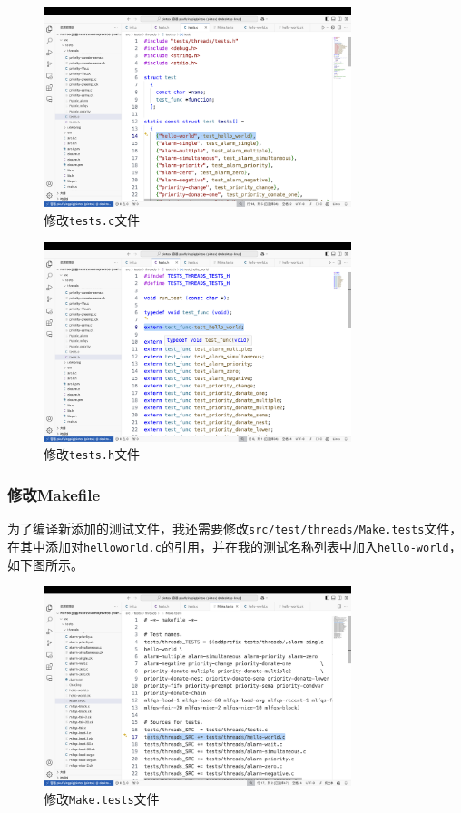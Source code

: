 \documentclass{article}
\begin{document}
\begin{figure}[H]
	\centering
	\includegraphics[width=0.8\textwidth]{img/testsc.png}
	\caption{修改\texttt{tests.c}文件}
\end{figure}

\begin{figure}[H]
	\centering
	\includegraphics[width=0.8\textwidth]{img/testsh.png}
	\caption{修改\texttt{tests.h}文件}
\end{figure}

\subsubsection{修改Makefile}
为了编译新添加的测试文件，我还需要修改\texttt{src/test/threads/Make.tests}文件，在其中添加对\texttt{helloworld.c}的引用，并在我的测试名称列表中加入\texttt{hello-world}，如下图所示。

\begin{figure}[H]
	\centering
	\includegraphics[width=0.8\textwidth]{img/maketests.png}
	\caption{修改\texttt{Make.tests}文件}
\end{figure}
\end{document}
